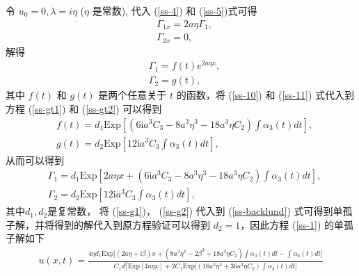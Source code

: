 令 $u_{0} = 0, \lambda = i\eta$ ($\eta$ 是常数), 代入 (\ref{ss-4}) 和  (\ref{ss-5})式可得
\begin{align}
  & \Gamma_{1x} = 2a\eta\Gamma_{1}, \\
  & \Gamma_{2x} = 0,
\end{align}
解得
\begin{align}
  & \Gamma_{1} = f(t)e^{2a\eta x},  \label{ss-10}\\
  & \Gamma_{2} = g(t), \label{ss-11}
\end{align}
其中 $f(t)$ 和 $g(t)$ 是两个任意关于  $t$ 的函数，将 (\ref{ss-10}) 和 (\ref{ss-11}) 式代入到方程 (\ref{ss-gt1}) 和 (\ref{ss-gt2}) 可以得到
\begin{align}
  & f(t) = d_{1}\mathrm{Exp}\left[(6\mathrm{i}a^{3}C_{3} - 8a^{3}\eta^{3} - 18a^{3}\eta C_{2})\int \alpha_{3}(t)dt\right], \\
  & g(t) = d_{2}\mathrm{Exp}\left[12\mathrm{i}a^{3}C_{3}\int \alpha_{3}(t)dt\right],
\end{align}
从而可以得到
\begin{align}
  & \Gamma_{1} = d_{1}\mathrm{Exp}\left[2a\eta x + (6\mathrm{i}a^{3}C_{3} - 8a^{3}\eta^{3} - 18a^{3}\eta C_{2})\int \alpha_{3}(t)dt\right], \label{ss-g1} \\
  & \Gamma_{2} = d_{2}\mathrm{Exp}\left[12\mathrm{i}a^{3}C_{3}\int \alpha_{3}(t)dt\right], \label{ss-g2}
\end{align}
其中$d_{1}, d_{2}$是复常数， 将  (\ref{ss-g1})， (\ref{ss-g2}) 代入到  (\ref{ss-backlund}) 式可得到单孤子解，并将得到的解代入到原方程验证可以得到 $d_{2} = 1$，因此方程 (\ref{ss-1}) 的单孤子解如下
\begin{align}
  u(x,t) = \frac{4\eta d_{1}\mathrm{Exp}\Big[(2a\eta+\mathrm{i}\beta)x + (8a^{3}\eta^{3} - 2\beta^{3} + 18a^{3}\eta C_{2})\int \alpha_{3}(t)dt - \int \alpha_{6}(t)dt\Big]}{C_1 d_{1}^{2}\mathrm{Exp}[4a\eta x] + 2C_1 \mathrm{Exp}\Big[(16a^{3}\eta^{3}+36a^{3}\eta C_{2})\int \alpha_{3}(t)dt\Big]}
\end{align}

